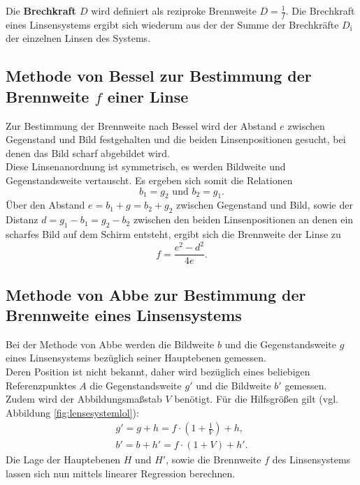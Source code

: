 Die \textbf{Brechkraft $D$} wird definiert als reziproke Brennweite $D=\frac{1}{f}$. Die Brechkraft eines Linsensystems ergibt sich wiederum aus der der Summe der Brechkräfte $D_{\mathrm{i}}$ der einzelnen Linsen des Systems.
\FloatBarrier
\subsection{Methode von Bessel zur Bestimmung der Brennweite $f$ einer Linse}
Zur Bestimmung der Brennweite nach Bessel wird der Abstand $e$ zwischen Gegenstand und Bild festgehalten und die beiden Linsenpositionen gesucht, bei denen das Bild scharf abgebildet wird.\\
Diese Linsenanordnung ist symmetrisch, es werden Bildweite und Gegenstandsweite vertauscht.
Es ergeben sich somit die Relationen
\begin{equation*}
b_{\mathrm{1}}=g_{\mathrm{2}} \text{ und } b_{\mathrm{2}}=g_{\mathrm{1}} \text{.}
\end{equation*}
Über den Abstand $e=b_{\mathrm{1}}+g_{\mathrm{}}=b_{\mathrm{2}}+g_{\mathrm{2}} $ zwischen Gegenstand und Bild, sowie der Distanz $d=g_{\mathrm{1}}-b_{\mathrm{1}}=g_{\mathrm{2}}-b_{\mathrm{2}}$ zwischen den beiden Linsenpositionen an denen ein scharfes Bild auf dem Schirm entsteht,
ergibt sich die Brennweite der Linse zu
\begin{equation}
  \label{eqn:nochmalbessel}
  f=\frac{e^2-d^2}{4e}\text{.}
\end{equation}

\subsection{Methode von Abbe zur Bestimmung der Brennweite eines Linsensystems}
Bei der Methode von Abbe werden die Bildweite $b$ und die Gegenstandsweite $g$ eines Linsensystems bezüglich seiner Hauptebenen gemessen.
\\Deren Position ist nicht bekannt, daher wird bezüglich eines beliebigen Referenzpunktes $A$ die Gegenstandsweite $g'$ und die Bildweite $b'$ gemessen.
\\Zudem wird der Abbildungsmaßstab $V$ benötigt.
Für die Hilfsgrößen gilt (vgl. Abbildung \ref{fig:lensesystemlol}):
\begin{gather}
  \label{eqn:abbe}
  g'=g+h=f\cdot\left(1+\frac{1}{V}\right)+h \text{,}\\
  b'=b+h'=f\cdot\left(1+V\right)+h' \text{.}
\end{gather}
Die Lage der Hauptebenen $H$ und $H'$, sowie die Brennweite $f$ des Linsensystems lassen sich nun mittels linearer Regression berechnen.
